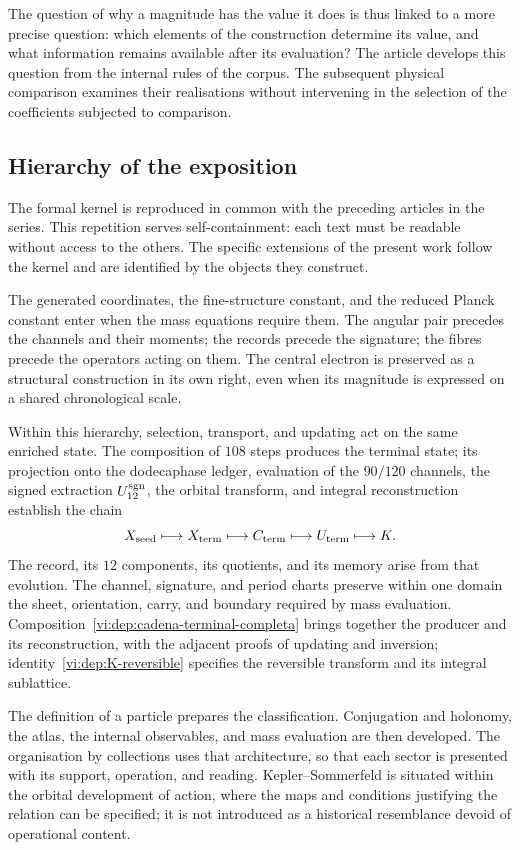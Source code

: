 The question of why a magnitude has the value it does is thus linked to
a more precise question: which elements of the construction determine its value, and
what information remains available after its evaluation? The article
develops this question from the internal rules of the corpus. The
subsequent physical comparison examines their realisations without intervening in
the selection of the coefficients subjected to comparison.

\subsection{Hierarchy of the exposition}

The formal kernel is reproduced in common with the preceding articles
in the series. This repetition serves self-containment:
each text must be readable without access to the others. The specific
extensions of the present work follow the kernel and are
identified by the objects they construct.

The generated coordinates, the fine-structure constant, and the reduced
Planck constant enter when the mass equations
require them. The angular pair precedes the channels and their moments;
the records precede the signature; the fibres precede the operators
acting on them. The central electron is preserved as a structural
construction in its own right, even when its magnitude is expressed on a shared
chronological scale.

Within this hierarchy, selection, transport, and updating act on the same
enriched state. The composition of \(108\) steps produces the terminal
state; its projection onto the dodecaphase ledger, evaluation of the
\(90/120\) channels, the signed extraction \(U_{12}^{\rm sgn}\), the
orbital transform, and integral reconstruction establish the chain
\[
 X_{\rm seed}\longmapsto X_{\rm term}\longmapsto
 C_{\rm term}\longmapsto U_{\rm term}\longmapsto K.
\]
The record, its \(12\) components, its quotients, and its memory arise
from that evolution. The channel, signature, and period charts preserve
within one domain the sheet, orientation, carry, and boundary required by
mass evaluation. Composition~\eqref{vi:dep:cadena-terminal-completa} brings
together the producer and its reconstruction, with the adjacent proofs of
updating and inversion; identity~\eqref{vi:dep:K-reversible} specifies the
reversible transform and its integral sublattice.

The definition of a particle prepares the classification. Conjugation
and holonomy, the atlas, the internal observables, and mass evaluation
are then developed. The organisation by collections uses
that architecture, so that each sector is presented with its support,
operation, and reading. Kepler--Sommerfeld is situated within the orbital
development of action, where the maps and conditions
justifying the relation can be specified; it is not introduced as a
historical resemblance devoid of operational content.


